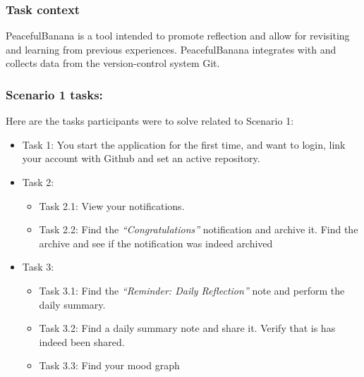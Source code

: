 \subsubsection{Task context}
PeacefulBanana is a tool intended to promote reflection and allow for revisiting and learning from previous experiences. PeacefulBanana integrates with and collects data from the version-control system Git.
\subsubsection{Scenario 1 tasks:}
Here are the tasks participants were to solve related to Scenario 1:
\begin{itemize}
	\item Task 1: You start the application for the first time, and want to login, link your account with Github and set an active repository.
	\item Task 2: 
		\begin{itemize}
			\item Task 2.1: View your notifications.
			\item Task 2.2: Find the \emph{“Congratulations”} notification and archive it. Find the archive and see if the notification was indeed archived
		\end{itemize}
	\item Task 3:
		\begin{itemize}
			\item Task 3.1: Find the \emph{“Reminder: Daily Reflection”} note and perform the daily summary.
			\item Task 3.2: Find a daily summary note and share it. Verify that is has indeed been shared.
			\item Task 3.3: Find your mood graph
		\end{itemize}
\end{itemize}

